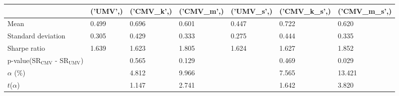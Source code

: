 \begin{tabular}{lllllll}
\toprule
 & ('UMV',) & ('CMV_k',) & ('CMV_m',) & ('UMV_s',) & ('CMV_k_s',) & ('CMV_m_s',) \\
\midrule
Mean & 0.499 & 0.696 & 0.601 & 0.447 & 0.722 & 0.620 \\
Standard deviation & 0.305 & 0.429 & 0.333 & 0.275 & 0.444 & 0.335 \\
Sharpe ratio & 1.639 & 1.623 & 1.805 & 1.624 & 1.627 & 1.852 \\
p-value(SR$_{\text{CMV}}$ - SR$_{\text{UMV}}$) &  & 0.565 & 0.129 &  & 0.469 & 0.029 \\
$\alpha$ (\%) &  & 4.812 & 9.966 &  & 7.565 & 13.421 \\
$t$($\alpha$) &  & 1.147 & 2.741 &  & 1.642 & 3.820 \\
\bottomrule
\end{tabular}
